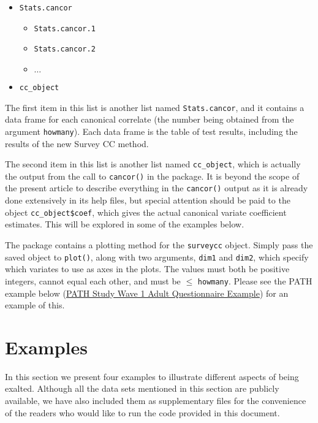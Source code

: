 \begin{itemize}
\tightlist
\item
  \texttt{Stats.cancor}

  \begin{itemize}
  \tightlist
  \item
    \texttt{Stats.cancor.1}
  \item
    \texttt{Stats.cancor.2}
  \item
    \(\dots\)
  \end{itemize}
\item
  \texttt{cc\_object}
\end{itemize}

The first item in this list is another list named \texttt{Stats.cancor}, and it contains a data frame for each canonical correlate (the number being obtained from the argument \texttt{howmany}). Each data frame is the table of test results, including the results of the new Survey CC method.

The second item in this list is another list named \texttt{cc\_object}, which is actually the output from the call to \texttt{cancor()} in the  package. It is beyond the scope of the present article to describe everything in the \texttt{cancor()} output as it is already done extensively in its help files, but special attention should be paid to the object \texttt{cc\_object\$coef}, which gives the actual canonical variate coefficient estimates. This will be explored in some of the examples below.

The  package contains a plotting method for the \texttt{surveycc} object. Simply pass the saved object to \texttt{plot()}, along with two arguments, \texttt{dim1} and \texttt{dim2}, which specify which variates to use as axes in the plots. The values must both be positive integers, cannot equal each other, and must be \(\leq\) \texttt{howmany}. Please see the PATH example below (\protect\hyperlink{path-study-wave-1-adult-questionnaire-example}{PATH Study Wave 1 Adult Questionnaire Example}) for an example of this.

\hypertarget{examples}{%
\section{Examples}\label{examples}}

In this section we present four examples to illustrate different aspects of  being exalted. Although all the data sets mentioned in this section are publicly available, we have also included them as supplementary files for the convenience of the readers who would like to run the code provided in this document.

